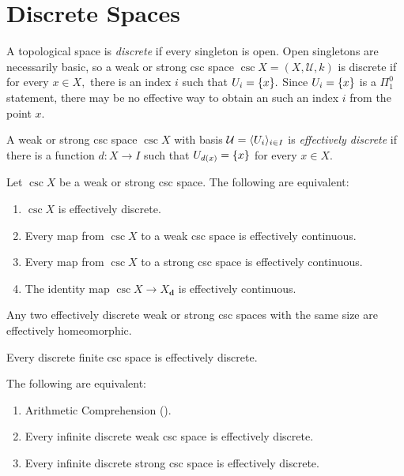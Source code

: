 \documentclass[csc]{subfiles}
\begin{document}
\newcommand{\disc}[1]{#1_{\mathbf{d}}}
\section{Discrete Spaces}

A topological space is \emph{discrete} if every singleton is open.
Open singletons are necessarily basic, so a weak or strong csc space \(\csc{X}=(X,\mathcal{U},k)\) is discrete if for every \(x \in X,\) there is an index \(i\) such that \(U_i = \lbrace x\rbrace.\)
Since \(U_i = \lbrace x\rbrace\) is a \(\Pi^0_1\) statement, there may be no effective way to obtain an such an index \(i\) from the point \(x.\)

\begin{definition}[\RCA]\label{D:EffDiscrete}
  A weak or strong csc space \(\csc{X}\) with basis \(\mathcal{U} = \langle U_i\rangle_{i \in I}\) is \emph{effectively discrete} if there is a function \(d:X \to I\) such that \(U_{d(x)} = \lbrace x\rbrace\) for every \(x \in X.\)
\end{definition}

\begin{theorem}[\RCA]\label{T:DiscreteMap}
  Let \(\csc{X}\) be a weak or strong csc space.
  The following are equivalent:
  \begin{enumerate}[\upshape(1)]
  \item \(\csc{X}\) is effectively discrete.
  \item Every map from \(\csc{X}\) to a weak csc space is effectively continuous. 
  \item Every map from \(\csc{X}\) to a strong csc space is effectively continuous.
  \item The identity map \(\csc{X}\to\disc{X}\) is effectively continuous.
  \end{enumerate}
\end{theorem}

\begin{proposition}[\RCA]\label{P:EffDiscreteIso}
  Any two effectively discrete weak or strong csc spaces with the same size are effectively homeomorphic.
\end{proposition}

\begin{proposition}[\RCA]
  Every discrete finite csc space is effectively discrete.
\end{proposition}

\begin{theorem}[\RCA]\label{T:Discrete}
  The following are equivalent:
  \begin{enumerate}[\upshape(1)]
  \item Arithmetic Comprehension \textup(\ACA\textup).
  \item Every infinite discrete weak csc space is effectively discrete.
  \item Every infinite discrete strong csc space is effectively discrete.
  \end{enumerate}
\end{theorem}
\end{document}
